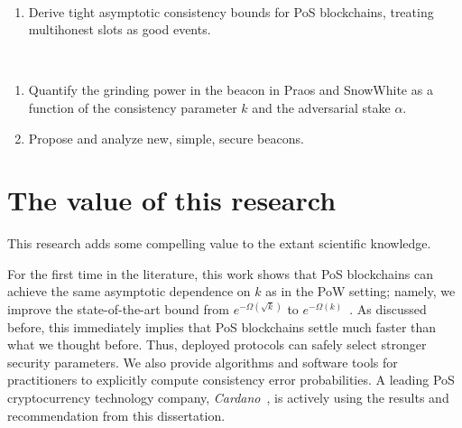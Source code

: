 \begin{description}[font=\normalfont\itshape\space]
  \item[Consistency Problem:]~
  \begin{enumerate}
    \item Derive tight asymptotic consistency bounds for PoS blockchains, 
    treating multihonest slots as good events.

    \setcounter{ConsistencyObjectives}{\value{enumi}}
  \end{enumerate}

  \item[Grinding Problem:]~
  \begin{enumerate}
    \setcounter{enumi}{\value{ConsistencyObjectives}}

    \item Quantify the grinding power in the beacon in Praos and SnowWhite 
    as a function of the consistency parameter $k$ and the adversarial stake $\alpha$.
    
    \item Propose and analyze new, simple, secure beacons.
  \end{enumerate}
\end{description}





\section{The value of this research}


This research adds some compelling value to the extant scientific knowledge. 

For the first time in the literature, 
this work shows that 
PoS blockchains can achieve the same asymptotic dependence on $k$ 
as in the PoW setting; namely, we improve the state-of-the-art bound 
from $e^{-\Omega(\sqrt{k})}$ to $e^{-\Omega(k)}$~\cite{LinearConsistencySODA}. 
As discussed before, this immediately implies that 
PoS blockchains settle much faster than what we thought before. 
Thus, deployed protocols can safely select stronger security parameters. 
We also provide algorithms and software tools 
for practitioners to explicitly compute consistency error probabilities. 
A leading PoS cryptocurrency technology company, \emph{Cardano}~\cite{Cardano}, 
is actively using the results and recommendation from this dissertation.

